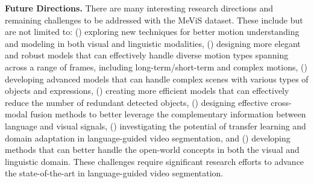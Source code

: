 \documentclass[10pt,twocolumn,letterpaper]{article}
\newcommand{\ourdataset}{MeViS\xspace}
\begin{document}
\textbf{Future Directions.} There are many interesting research directions and remaining challenges to be addressed with the \ourdataset dataset. These include but are not limited to: () exploring new techniques for better motion understanding and modeling in both visual and linguistic modalities, () designing more elegant and robust models that can effectively handle diverse motion types spanning across a range of frames, including long-term/short-term and complex motions, () developing advanced models that can handle complex scenes with various types of objects and expressions, () creating more efficient models that can effectively reduce the number of redundant detected objects, () designing effective cross-modal fusion methods to better leverage the complementary information between language and visual signals, () investigating the potential of transfer learning and domain adaptation in language-guided video segmentation, and () developing methods that can better handle the open-world concepts in both the visual and linguistic domain. These challenges require significant research efforts to advance the state-of-the-art in language-guided video segmentation.

 

{\footnotesize


}
\end{document}
